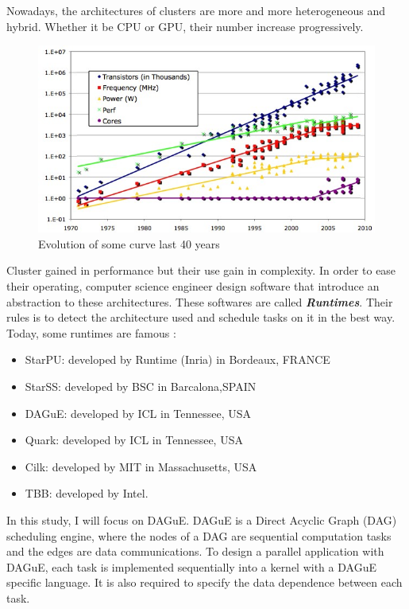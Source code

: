 \documentclass{report}
\begin{document}
Nowadays, the architectures of clusters are more and more heterogeneous and hybrid. Whether it be CPU or GPU, their number increase progressively.
\begin{figure}[!h]
\begin{center}
\includegraphics[width=\textwidth]{increase.png} 
\end{center}
\caption{Evolution of some curve last 40 years}
\end{figure}
Cluster gained in performance but their use gain in complexity. In order to ease their operating, computer science engineer design software that introduce an abstraction to these architectures. These softwares are called \textbf{\textit{Runtimes}}. Their rules is to detect the architecture used and schedule tasks on it in the best way. Today, some runtimes are famous :
\begin{itemize}
\item StarPU: developed by Runtime (Inria) in Bordeaux, FRANCE
\item StarSS: developed by BSC in Barcalona,SPAIN
\item DAGuE: developed by ICL in Tennessee, USA
\item Quark: developed by ICL in Tennessee, USA
\item Cilk: developed by MIT in Massachusetts, USA
\item TBB: developed by Intel.
\end{itemize}
In this study, I will focus on DAGuE. DAGuE is a Direct Acyclic Graph (DAG) scheduling engine, where the nodes of a DAG are sequential computation tasks and the edges are data communications. To design a parallel application with DAGuE, each task is implemented sequentially into a kernel with a DAGuE specific language. It is also required to specify the data dependence between each task.
\end{document}
